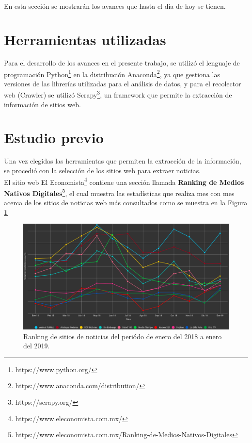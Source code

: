 \ \\\\
En esta sección se mostrarán los avances que hasta el día de hoy se tienen.

\section{Herramientas utilizadas}
Para el desarrollo de los avances en el presente trabajo, se utilizó el lenguaje de programación Python\footnote{https://www.python.org/} 
en la distribución Anaconda\footnote{https://www.anaconda.com/distribution/}, ya que gestiona las 
versiones de las librerías utilizadas para el análisis de datos, y para el recolector web (Crawler) se utilizó Scrapy\footnote{https://scrapy.org/}, 
un framework que permite la extracción de información de sitios web.


\section{Estudio previo}
Una vez elegidas las herramientas que permiten la extracción de la información, se procedió con la selección de los 
sitios web para extraer noticias.
\\
El sitio web El Economista\footnote{https://www.eleconomista.com.mx/} contiene una sección llamada 
\textbf{Ranking de Medios Nativos Digitales}\footnote{https://www.eleconomista.com.mx/Ranking-de-Medios-Nativos-Digitales}, 
el cual muestra las estadísticas que realiza mes con mes acerca de los sitios de noticias web más consultados como se muestra 
en la Figura \textbf{\ref{fig:rank}}
\begin{figure}[H]
  \centering
  \includegraphics[scale=.28]{imagenes/Capitulo5/ranking}
  \caption{Ranking de sitios de noticias del periódo de enero del 2018 a enero del 2019.}
  \label{fig:rank}
\end{figure}
 


